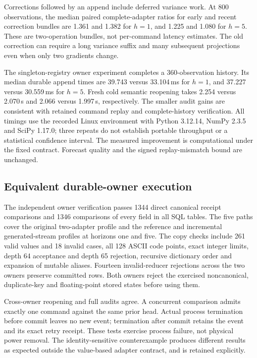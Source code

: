 \documentclass[11pt,a4paper]{article}
\theoremstyle{definition}\newtheorem{definition}[theorem]{Definition}
\begin{document}
Corrections followed by an append include deferred variance work. At 800 observations, the median paired complete-adapter ratios for early and recent correction bundles are 1.361 and 1.382 for $h=1$, and 1.225 and 1.080 for $h=5$. These are two-operation bundles, not per-command latency estimates. The old correction can require a long variance suffix and many subsequent projections even when only two gradients change.

The singleton-registry owner experiment completes a 360-observation history. Its median durable append times are 39.743 versus 33.104\,ms for $h=1$, and 37.227 versus 30.559\,ms for $h=5$. Fresh cold semantic reopening takes 2.254 versus 2.070\,s and 2.066 versus 1.997\,s, respectively. The smaller audit gains are consistent with retained command replay and complete-history verification. All timings use the recorded Linux environment with Python 3.12.14, NumPy 2.3.5 and SciPy 1.17.0; three repeats do not establish portable throughput or a statistical confidence interval. The measured improvement is computational under the fixed contract. Forecast quality and the signed replay-mismatch bound are unchanged.

\subsection{Equivalent durable-owner execution}\label{sec:fastownerresults}
The independent owner verification passes 1344 direct canonical receipt comparisons and 1346 comparisons of every field in all SQL tables. The five paths cover the original two-adapter profile and the reference and incremental generated-stream profiles at horizons one and five. The copy checks include 261 valid values and 18 invalid cases, all 128 ASCII code points, exact integer limits, depth 64 acceptance and depth 65 rejection, recursive dictionary order and expansion of mutable aliases. Fourteen invalid-reducer rejections across the two owners preserve committed rows. Both owners reject the exercised noncanonical, duplicate-key and floating-point stored states before using them.

Cross-owner reopening and full audits agree. A concurrent comparison admits exactly one command against the same prior head. Actual process termination before commit leaves no new event; termination after commit retains the event and its exact retry receipt. These tests exercise process failure, not physical power removal. The identity-sensitive counterexample produces different results as expected outside the value-based adapter contract, and is retained explicitly.
\end{document}
